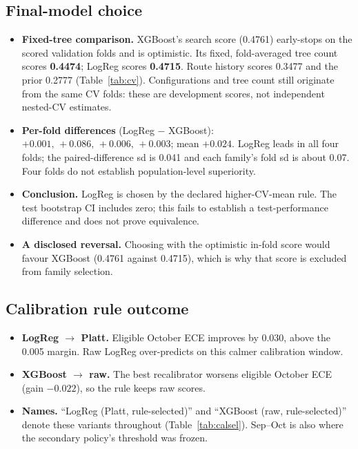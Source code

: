 \documentclass[conference]{IEEEtran}
\newcommand{\tabsize}{\footnotesize}
\begin{document}
\subsection{Final-model choice}
\begin{itemize}
\item \textbf{Fixed-tree comparison.} XGBoost's search score (0.4761) early-stops on the scored validation folds and is optimistic. Its fixed, fold-averaged tree count scores \textbf{0.4474}; LogReg scores \textbf{0.4715}. Route history scores 0.3477 and the prior 0.2777 (Table~\ref{tab:cv}). Configurations and tree count still originate from the same CV folds: these are development scores, not independent nested-CV estimates.
\item \textbf{Per-fold differences} (LogReg $-$ XGBoost): $+0.001,\,+0.086,\,+0.006,\,+0.003$; mean $+0.024$. LogReg leads in all four folds; the paired-difference sd is 0.041 and each family's fold sd is about 0.07. Four folds do not establish population-level superiority.
\item \textbf{Conclusion.} LogReg is chosen by the declared higher-CV-mean rule. The test bootstrap CI includes zero; this fails to establish a test-performance difference and does not prove equivalence.
\item \textbf{A disclosed reversal.} Choosing with the optimistic in-fold score would favour XGBoost (0.4761 against 0.4715), which is why that score is excluded from family selection.
\end{itemize}

\begin{table}[!t]
\caption[Rolling-CV model comparison.]{Rolling-CV PR-AUC (validation months May--Aug), models scored as deployed.}
\label{tab:cv}
\centering\tabsize

\end{table}

\subsection{Calibration rule outcome}
\begin{itemize}
\item \textbf{LogReg $\to$ Platt.} Eligible October ECE improves by 0.030, above the 0.005 margin. Raw LogReg over-predicts on this calmer calibration window.
\item \textbf{XGBoost $\to$ raw.} The best recalibrator worsens eligible October ECE (gain $-0.022$), so the rule keeps raw scores.
\item \textbf{Names.} ``LogReg (Platt, rule-selected)'' and ``XGBoost (raw, rule-selected)'' denote these variants throughout (Table~\ref{tab:calsel}). Sep--Oct is also where the secondary policy's threshold was frozen.
\end{itemize}
\end{document}
